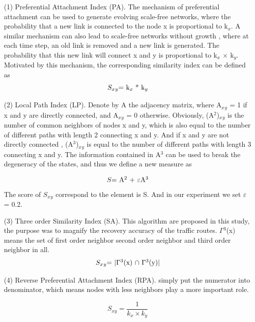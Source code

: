 \documentclass[onecolumn,preprintnumbers,amsmath,amssymb]{revtex4}
\begin{document}
(1) Preferential Attachment Index (PA)\cite{WG}. The mechanism of preferential attachment can be used to generate evolving scale-free networks, where the probability that a new link is connected to the node x is proportional to k$_x$. A similar mechanism can also lead to scale-free networks without growth , where at each time step, an old link is removed and a new link is generated. The probability that this new link will connect x and y is proportional to k$_x$ × k$_y$. Motivated by this mechanism, the corresponding similarity index can be defined as
\begin{equation}
\centerline{
$S_x$$_y$=
k$_x$ * k$_y$
}
\end{equation}


(2) Local Path Index (LP)\cite{AC,LI}. Denote by A the adjacency matrix, where A$_x$$_y$ = 1 if x and y are directly connected, and A$_x$$_y$ = 0 otherwise. Obviously, (A$^2$)$_x$$_y$ is the number of common neighbors of nodes x and y, which is also equal to the number of different paths with length 2 connecting x and y. And if x and y are not directly connected , (A$^3$)$_x$$_y$ is equal to the number of different paths with length 3 connecting x and y. The information contained in A$^3$ can be used to break the degeneracy of the states, and thus we define a new measure as

\begin{equation}
\centerline{
$S$=
A$^2$ + $\varepsilon$A$^3$
}
\end{equation}
The score of $S_x$$_y$ correspond to the element is S. And in our experiment we set 
$\varepsilon$= 0.2.


(3) Three order Similarity Index (SA). This algorithm are proposed in this study, the purpose was to magnify the recovery accuracy of the traffic routes. $\Gamma$$^3$(x) means the set of first order neighbor second order neighbor and third order neighbor in all.
\begin{equation}
\centerline{
$S_x$$_y$=
$|$$\Gamma$$^3$(x) $\cap$ $\Gamma$$^3$(y)$|$
}
\end{equation}


(4) Reverse Preferential Attachment Index (RPA). simply put the numerator into denominator, which means nodes with less neighbors play a more important role.


\begin{equation}
S_{xy}=\frac{1}{k_x \times k_y}
\end{equation}
\end{document}
